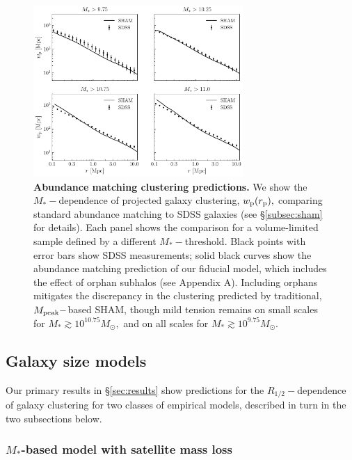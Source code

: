 \documentclass[usenatbib,usegraphicx,letterpaper]{mn2e}
\newcommand{\rhalf}{R_{1/2}}
\newcommand{\mstar}{M_{\ast}}
\newcommand{\mpeak}{M_{\rm peak}}
\newcommand{\rproj}{r_{\rm p}}
\newcommand{\wproj}{w_{\rm p}}
\newcommand{\msun}{M_\odot}
\begin{document}
\begin{figure}
\centering
\includegraphics[width=8cm]{FIGS/baseline_sham.pdf}
\caption{
{\bf Abundance matching clustering predictions.}
We show the $\mstar-$dependence of projected galaxy clustering, $\wproj(\rproj),$ comparing standard abundance matching to SDSS galaxies (see \S\ref{subsec:sham} for details). Each panel shows the comparison for a volume-limited sample defined by a different $\mstar-$threshold. Black points with error bars show SDSS measurements; solid black curves show the abundance matching prediction of our fiducial model, which includes the effect of orphan subhalos (see Appendix A). Including orphans mitigates the discrepancy in the clustering predicted by traditional, $\mpeak-$based SHAM, though mild tension remains on small scales for $\mstar\gtrsim10^{10.75}\msun,$ and on all scales for $\mstar\gtrsim10^{9.75}\msun.$
}
\label{fig:baseline_sham_clustering}
\end{figure}

\subsection{Galaxy size models}
\label{subsec:model}

Our primary results in \S\ref{sec:results} show predictions for the $\rhalf-$dependence of galaxy clustering for two classes of empirical models, described in turn in the two subsections below.

\subsubsection{$\mstar$-based model with satellite mass loss}
\label{subsubsec:strippingmodel}
\end{document}
